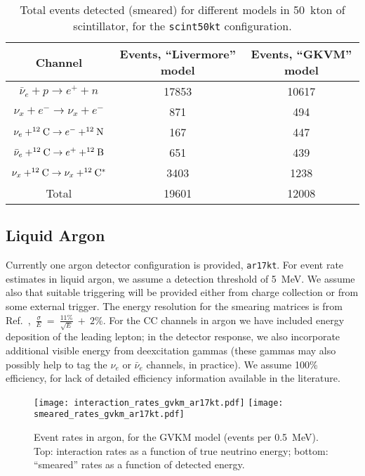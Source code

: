 \documentclass[12pt]{article}
\begin{document}
\begin{table}[h]
\centering
\begin{tabular}{|c|c|c|}
\hline
Channel & Events, ``Livermore'' model & Events, ``GKVM'' model  \\
\hline
   $\bar{\nu}_e+ p \rightarrow e^+ + n$                  &  17853 &   10617\\
$\nu_x + e^- \rightarrow \nu_x + e^-$                           & 871 &   494\\
$\nu_e + ^{12}{\rm C} \rightarrow e^- + ^{12}{\rm N}$         & 167  &  447  \\
$\bar{\nu}_e + ^{12}{\rm C} \rightarrow e^+ + ^{12}{\rm B}$  & 651 &  439 \\


$\nu_x + ^{12}{\rm C} \rightarrow \nu_x+ ^{12}{\rm C}^*$
                         &  3403 &  1238 \\ \hline
Total &  19601 & 12008 \\ \hline
\end{tabular}
\caption{Total events detected (smeared) for different models in 50~kton of scintillator, for the
\texttt{scint50kt} configuration. }
\label{tab:scinttable}
\end{table}


\subsection{Liquid Argon}

Currently one argon detector configuration is provided,
\texttt{ar17kt}.  For event rate estimates in liquid argon, we assume
a detection threshold of 5~MeV.  We assume also that suitable
triggering will be provided either from charge collection or from some
external trigger.  The energy resolution for the smearing matrices is
from
Ref.~\cite{Amoruso:2003sw},~$\frac{\sigma}{E}~=~\frac{11\%}{\sqrt{E}}~+~2\%$.
For the CC channels in argon we have included energy deposition of the
leading lepton; in the detector response, we also incorporate
additional visible energy from deexcitation gammas (these gammas may
also possibly help to tag the $\nu_e$ or $\bar{\nu}_e$ channels,
in practice).  We assume 100\%
efficiency, for lack of detailed efficiency information available in
the literature.


\begin{figure}[htb]
  \centering\texttt{[image: interaction\_rates\_gvkm\_ar17kt.pdf]}
  \centering\texttt{[image: smeared\_rates\_gvkm\_ar17kt.pdf]}

  \caption{Event rates in argon, for the GVKM model (events per 0.5~MeV). Top: interaction rates as a
    function of true neutrino energy; bottom:  ``smeared''
    rates as a function of detected energy.}
  \label{fig:larrates}
\end{figure}
\end{document}
